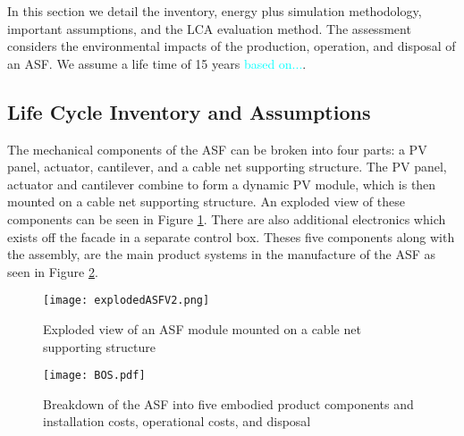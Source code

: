 
In this section we detail the inventory, energy plus simulation methodology, important assumptions, and the LCA evaluation method. The assessment considers the environmental impacts of the production, operation, and disposal of an ASF. We assume a life time of 15 years \textcolor{cyan}{based on...}.
\\

\subsection{Life Cycle Inventory and Assumptions}

The mechanical components of the ASF can be broken into four parts: a PV panel, actuator, cantilever, and a cable net supporting structure. The PV panel, actuator and cantilever combine to form a dynamic PV module, which is then mounted on a cable net supporting structure. An exploded view of these components can be seen in Figure \ref{fig:explodedView}. There are also additional electronics which exists off the facade in a separate control box. Theses five components along with the assembly, are the main product systems in the manufacture of the ASF as seen in Figure \ref{fig:BOS}. 



\begin{figure}[H]
\begin{center}
\texttt{[image: explodedASFV2.png]}
\caption{Exploded view of an ASF module mounted on a cable net supporting structure}
\label{fig:explodedView}
\end{center}
\end{figure}

\begin{figure}[ht]
\begin{center}
\texttt{[image: BOS.pdf]}
\caption{Breakdown of the ASF into five embodied product components and installation costs, operational costs, and disposal}
\label{fig:BOS}
\end{center}
\end{figure}

